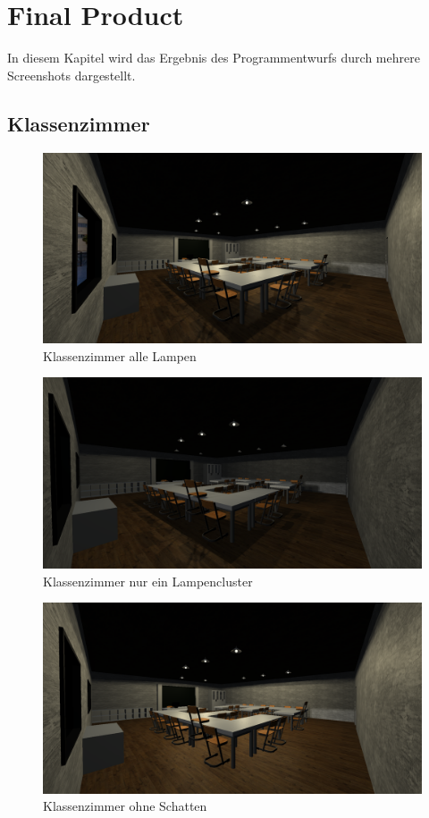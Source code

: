 \section{Final Product}
In diesem Kapitel wird das Ergebnis des Programmentwurfs durch mehrere Screenshots dargestellt.
\subsection{Klassenzimmer}
\begin{figure}[H]
  \centering
  \includegraphics[width=1\textwidth]{images/finalproduct/screenshot_all_shader.png}
  \caption{Klassenzimmer alle Lampen}
  \label{fig:ScreenshotShaderAllLamp}
\end{figure}\noindent
\begin{figure}[H]
  \centering
  \includegraphics[width=1\textwidth]{images/finalproduct/screenshot_all_shader_only_one_lamp.png}
  \caption{Klassenzimmer nur ein Lampencluster}
  \label{fig:ScreenshotShaderOneLamp}
\end{figure}\noindent
\begin{figure}[H]
  \centering
  \includegraphics[width=1\textwidth]{images/finalproduct/screenshot_no_shader.png}
  \caption{Klassenzimmer ohne Schatten}
  \label{fig:ScreenshotNoShaderAllLamp}
\end{figure}\noindent
